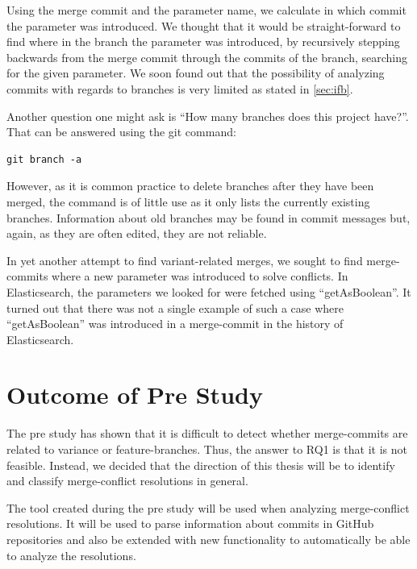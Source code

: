Using the merge commit and the parameter name, we calculate in which commit the parameter was introduced. We thought that it would be straight-forward to find where in the branch the parameter was introduced, by recursively stepping backwards from the merge commit through the commits of the branch, searching for the given parameter. We soon found out that the possibility of analyzing commits with regards to branches is very limited as stated in \ref{sec:ifb}.

Another question one might ask is “How many branches does this project have?”. That can be answered using the git command:
\lstset{language=Bash,numbers=left,xleftmargin=2em,frame=single,framexleftmargin=1.5em}
\begin{lstlisting}[frame=single,breaklines=true,tabsize=2]
git branch -a
\end{lstlisting}
However, as it is common practice to delete branches after they have been merged, the command is of little use as it only lists the currently existing branches. Information about old branches may be found in commit messages but, again, as they are often edited, they are not reliable.

In yet another attempt to find variant-related merges, we sought to find merge-commits where a new parameter was introduced to solve conflicts. In Elasticsearch, the parameters we looked for were fetched using “getAsBoolean”. It turned out that there was not a single example of such a case where “getAsBoolean” was introduced in a merge-commit in the history of Elasticsearch.
\section{Outcome of Pre Study}
The pre study has shown that it is difficult to detect whether merge-commits are related to variance or feature-branches. Thus, the answer to RQ1 is that it is not feasible. Instead, we decided that the direction of this thesis will be to identify and classify merge-conflict resolutions in general.

The tool created during the pre study will be used when analyzing merge-conflict resolutions. It will be used to parse information about commits in GitHub repositories and also be extended with new functionality to automatically be able to analyze the resolutions.











